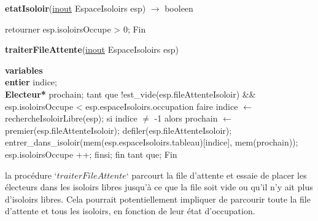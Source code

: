 \documentclass[12pt]{article} %
\begin{document}
\begin{algorithm}
	\caption{\textbf{etatIsoloir}(\underline{inout} EspaceIsoloirs esp) $\rightarrow$ booleen}
	\begin{algorithmic}[1]
		\Start
		\State retourner esp.isoloirsOccupe > 0; 
		\State Fin
	\end{algorithmic}
\end{algorithm}

\begin{algorithm}
	\caption{\textbf{traiterFileAttente}(\underline{inout} EspaceIsoloirs esp)}
	\begin{algorithmic}[1]
		\State \textbf{variables}\\ \textbf{entier} indice;\\\textbf{Electeur*} prochain;
		\Start
		\State tant que !est\_vide(esp.fileAttenteIsoloir) \&\& esp.isoloirsOccupe < esp.espaceIsoloirs.occupation faire
		\State  \hspace{\algorithmicindent} indice $\leftarrow$ rechercheIsoloirLibre(esp);
		\State  \hspace{\algorithmicindent} si indice $\neq$ -1 alors 
		\State  \hspace{\algorithmicindent}  \hspace{\algorithmicindent} prochain $\leftarrow$ premier(esp.fileAttenteIsoloir);
		\State  \hspace{\algorithmicindent} \hspace{\algorithmicindent} defiler(esp.fileAttenteIsoloir);
		\State  \hspace{\algorithmicindent} \hspace{\algorithmicindent} entrer\_dans\_isoloir(mem(esp.espaceIsoloirs.tableau)[indice], mem(prochain));
		 \State  \hspace{\algorithmicindent} \hspace{\algorithmicindent} esp.isoloirsOccupe ++;
		 \State  \hspace{\algorithmicindent} \hspace{\algorithmicindent} finsi;
		 \State  \hspace{\algorithmicindent} fin tant que;
		\State Fin
	\end{algorithmic}
\end{algorithm}

la procédure `$traiterFileAttente$` parcourt la file d'attente et essaie de placer les électeurs dans les isoloirs libres jusqu'à ce que la file soit vide ou qu'il n'y ait plus d'isoloirs libres. Cela pourrait potentiellement impliquer de parcourir toute la file d'attente et tous les isoloirs, en fonction de leur état d'occupation.
\end{document}
